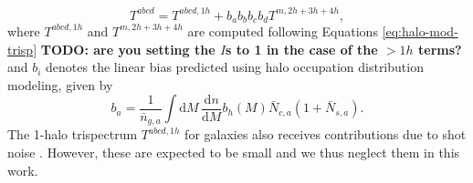 \documentclass[a4paper,11pt]{article}
\newcommand{\todo}[1]{{\bf TODO: #1}}
\begin{document}
    \begin{equation}
      T^{abcd} = T^{abcd, 1h} + b_{a}b_{b}b_{c}b_{d}T^{m, 2h+3h+4h},
    \end{equation}
    where $T^{abcd, 1h}$ and $T^{m, 2h+3h+4h}$ are computed following Equations \ref{eq:halo-mod-trisp} \todo{are you setting the $I$s to 1 in the case of the $>1h$ terms?} and $b_{i}$ denotes the linear bias predicted using halo occupation distribution modeling, given by
    \begin{equation}
      b_{a}=\frac{1}{\bar{n}_{g, a}}\int \mathrm{d}M\,\frac{\mathrm{d}n}{\mathrm{d}M}b_{h}(M) \bar{N}_{c, a}(1+\bar{N}_{s, a}).
    \end{equation}
    The 1-halo trispectrum $T^{abcd, 1h}$ for galaxies also receives contributions due to shot noise \cite{Lacasa:2018}. However, these are expected to be small \cite{Lacasa:2018} and we thus neglect them in this work.
\end{document}

